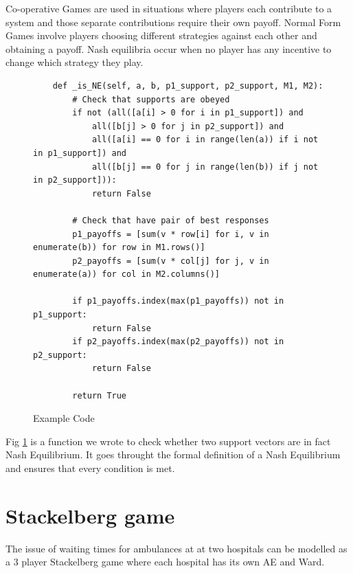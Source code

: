 \documentclass[a0,landscape]{a0poster}
\begin{document}
\begin{multicols}{3}
Co-operative Games are used in situations where players each contribute to a system and those separate contributions require their own payoff.
Normal Form Games involve players choosing different strategies against each other and obtaining a payoff.
Nash equilibria occur when no player has any incentive to change which strategy they play.

\begin{figure}[H]
\color{black}
\begin{verbatim}
    def _is_NE(self, a, b, p1_support, p2_support, M1, M2):
        # Check that supports are obeyed
        if not (all([a[i] > 0 for i in p1_support]) and
            all([b[j] > 0 for j in p2_support]) and
            all([a[i] == 0 for i in range(len(a)) if i not in p1_support]) and
            all([b[j] == 0 for j in range(len(b)) if j not in p2_support])):
            return False

        # Check that have pair of best responses
        p1_payoffs = [sum(v * row[i] for i, v in enumerate(b)) for row in M1.rows()]
        p2_payoffs = [sum(v * col[j] for j, v in enumerate(a)) for col in M2.columns()]

        if p1_payoffs.index(max(p1_payoffs)) not in p1_support:
            return False
        if p2_payoffs.index(max(p2_payoffs)) not in p2_support:
            return False

        return True
\end{verbatim}
\caption{Example Code}
\label{fig:check_NE}
\end{figure}

Fig \ref{fig:check_NE} is a function we wrote to check whether two support vectors are in fact Nash Equilibrium.
It goes throught the formal definition of a Nash Equilibrium and ensures that every condition is met.

\color{Goldenrod}
\section*{Stackelberg game}
The issue of waiting times for ambulances at at two hospitals can be modelled as a 3 player Stackelberg game where each hospital has its own AE and Ward.



\end{multicols}
\end{document}
